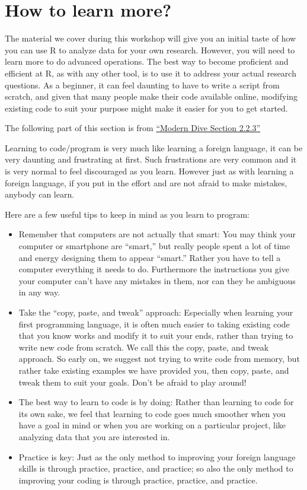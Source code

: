 \documentclass[
]{book}
\providecommand{\tightlist}{%
  \setlength{\itemsep}{0pt}\setlength{\parskip}{0pt}}
\begin{document}
\section{How to learn more?}\label{how-to-learn-more}

The material we cover during this workshop will give you an initial taste of how you can use R to analyze data for your own research. However, you will need to learn more to do advanced operations. The best way to become proficient and efficient at R, as with any other tool, is to use it to address your actual research questions. As a beginner, it can feel daunting to have to write a script from scratch, and given that many people make their code available online, modifying existing code to suit your purpose might make it easier for you to get started.

The following part of this section is from \href{\%22https://moderndive.com/2-getting-started.html\%22}{``Modern Dive Section 2.2.3''}

Learning to code/program is very much like learning a foreign language, it can be very daunting and frustrating at first. Such frustrations are very common and it is very normal to feel discouraged as you learn. However just as with learning a foreign language, if you put in the effort and are not afraid to make mistakes, anybody can learn.

Here are a few useful tips to keep in mind as you learn to program:

\begin{itemize}
\tightlist
\item
  Remember that computers are not actually that smart: You may think your computer or smartphone are ``smart,'' but really people spent a lot of time and energy designing them to appear ``smart.'' Rather you have to tell a computer everything it needs to do. Furthermore the instructions you give your computer can't have any mistakes in them, nor can they be ambiguous in any way.
\item
  Take the ``copy, paste, and tweak'' approach: Especially when learning your first programming language, it is often much easier to taking existing code that you know works and modify it to suit your ends, rather than trying to write new code from scratch. We call this the copy, paste, and tweak approach. So early on, we suggest not trying to write code from memory, but rather take existing examples we have provided you, then copy, paste, and tweak them to suit your goals. Don't be afraid to play around!
\item
  The best way to learn to code is by doing: Rather than learning to code for its own sake, we feel that learning to code goes much smoother when you have a goal in mind or when you are working on a particular project, like analyzing data that you are interested in.
\item
  Practice is key: Just as the only method to improving your foreign language skills is through practice, practice, and practice; so also the only method to improving your coding is through practice, practice, and practice.
\end{itemize}
\end{document}
